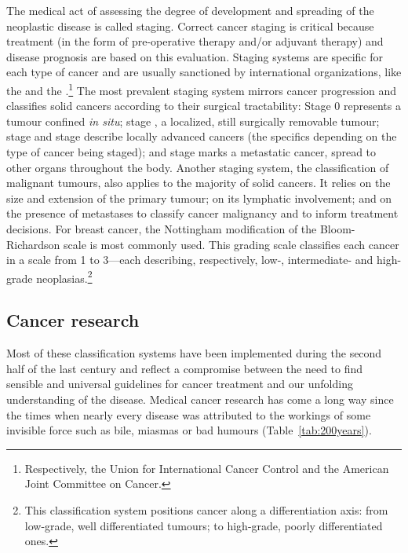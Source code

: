 The medical act of assessing the degree of development and spreading of the
neoplastic disease is called staging.  Correct cancer staging is critical
because treatment (in the form of pre-operative therapy and/or adjuvant therapy)
and disease prognosis are based on this evaluation.  Staging systems are
specific for each type of cancer and are usually sanctioned by international
organizations, like the  and the
.\footnote{Respectively, the Union for International Cancer
  Control and the American Joint Committee on Cancer.}  The most prevalent
staging system mirrors cancer progression and classifies solid cancers according
to their surgical tractability: Stage 0 represents a tumour confined \emph{in
  situ}; stage , a localized, still surgically removable tumour;
stage  and stage  describe locally advanced cancers
(the specifics depending on the type of cancer being staged); and stage
 marks a metastatic cancer, spread to other organs throughout the
body.\cite{greene_ajcc_2002} Another staging system, the 
classification of malignant tumours, also applies to the majority of solid
cancers. It relies on the size and extension of the primary tumour; on its
lymphatic involvement; and on the presence of metastases to classify cancer
malignancy and to inform treatment decisions.\cite{denoix_enquete_1946} For
breast cancer, the Nottingham modification of the Bloom-Richardson scale is most
commonly used. This grading scale classifies each cancer in a scale from 1 to
3---each describing, respectively, low-, intermediate- and high-grade
neoplasias.\footnote{This classification system positions cancer along a
  differentiation axis: from low-grade, well differentiated tumours; to
  high-grade, poorly differentiated ones.}

\subsection{Cancer research}
\label{cancer-research}

Most of these classification systems have been implemented during the second
half of the last century and reflect a compromise between the need to find
sensible and universal guidelines for cancer treatment and our unfolding
understanding of the disease.  Medical cancer research has come a long way since
the times when nearly every disease was attributed to the workings of some
invisible force such as bile, miasmas or bad humours (Table~\ref{tab:200years}).

